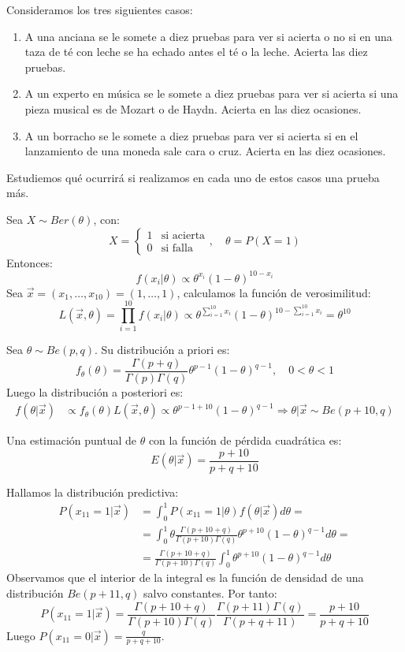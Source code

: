 \begin{example}
    Consideramos los tres siguientes casos:
    \begin{enumerate}
        \item A una anciana se le somete a diez pruebas para ver si acierta o no si en una taza de té con leche se ha echado antes el té o la leche.
              Acierta las diez pruebas.
        \item A un experto en música se le somete a diez pruebas para ver si acierta si una pieza musical es de Mozart o de Haydn.
              Acierta en las diez ocasiones.
        \item A un borracho se le somete a diez pruebas para ver si acierta si en el lanzamiento de una moneda sale cara o cruz.
              Acierta en las diez ocasiones.
    \end{enumerate}
    Estudiemos qué ocurrirá si realizamos en cada uno de estos casos una prueba más.

    Sea $X \sim Ber(\theta)$, con:
    $$X = \begin{cases}
            1 & \text{si acierta} \\
            0 & \text{si falla}
        \end{cases}, \quad \theta = P(X=1)$$
    Entonces:
    $$f(x_i|\theta) \propto \theta^{x_i}(1-\theta)^{10-x_i}$$
    Sea $\vec{x} = (x_1, \dots, x_{10}) = (1, \dots, 1)$, calculamos la función de verosimilitud:
    $$L(\vec{x}, \theta) = \prod_{i=1}^{10} f(x_i|\theta) \propto \theta^{\sum_{i=1}^{10} x_i}(1-\theta)^{10-\sum_{i=1}^{10} x_i} = \theta^{10}$$

    Sea $\theta \sim Be(p, q)$.
    Su distribución a priori es:
    $$f_\theta(\theta) = \frac{\Gamma(p+q)}{\Gamma(p)\Gamma(q)} \theta^{p-1}(1-\theta)^{q-1}, \quad 0 < \theta < 1$$
    Luego la distribución a posteriori es:
    \begin{align*}
        f(\theta|\vec{x}) & \propto f_\theta(\theta)L(\vec{x}, \theta) \propto \theta^{p-1+10}(1-\theta)^{q-1} \Rightarrow \theta|\vec{x} \sim Be(p+10, q)
    \end{align*}

    Una estimación puntual de $\theta$ con la función de pérdida cuadrática es:
    $$E(\theta|\vec{x}) = \frac{p+10}{p+q+10}$$

    Hallamos la distribución predictiva:
    \begin{align*}
        P(x_{11}=1|\vec{x}) & = \int_0^1 P(x_{11}=1|\theta)f(\theta|\vec{x})d\theta =                                               \\
                            & = \int_0^1 \theta \frac{\Gamma(p+10+q)}{\Gamma(p+10)\Gamma(q)} \theta^{p+10}(1-\theta)^{q-1}d\theta = \\
                            & = \frac{\Gamma(p+10+q)}{\Gamma(p+10)\Gamma(q)} \int_0^1 \theta^{p+10}(1-\theta)^{q-1}d\theta
    \end{align*}
    Observamos que el interior de la integral es la función de densidad de una distribución $Be(p+11, q)$ salvo constantes.
    Por tanto:
    $$P(x_{11}=1|\vec{x}) = \frac{\Gamma(p+10+q)}{\Gamma(p+10)\Gamma(q)} \frac{\Gamma(p+11)\Gamma(q)}{\Gamma(p+q+11)} = \frac{p+10}{p+q+10}$$
    Luego $P(x_{11}=0|\vec{x}) = \frac{q}{p+q+10}$.


\end{example}
